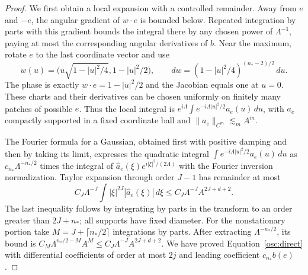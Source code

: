 \begin{proof}
We first obtain a local expansion with a controlled remainder.  Away
from $e$ and $-e$, the angular gradient of $w\cdot e$ is bounded below.
Repeated integration by parts with this gradient bounds the integral
there by any chosen power of $\Lambda^{-1}$, paying at most the
corresponding angular derivatives of $b$.  Near the maximum, rotate $e$
to the last coordinate vector and use
\[
 w(u)=\bigl(u\sqrt{1-|u|^2/4},1-|u|^2/2\bigr),\qquad
 dw=(1-|u|^2/4)^{(n_*-2)/2}\,du.
\]
The phase is exactly $w\cdot e=1-|u|^2/2$ and the Jacobian equals one at
$u=0$.  These charts and their
derivatives can be chosen uniformly on finitely many patches of possible
$e$.  Thus the local integral is
$e^{i\Lambda}\int e^{-i\Lambda|u|^2/2}a_e(u)\,du$, with $a_e$
compactly supported in a fixed coordinate ball and
$\|a_e\|_{C^m}\lesssim_m A^m$.

The Fourier formula for a Gaussian, obtained first with positive damping
and then by taking its limit, expresses the quadratic integral
$\int e^{-i\Lambda|u|^2/2}a_e(u)\,du$ as
$c_{n_*}\Lambda^{-n_*/2}$ times the integral of
$\widehat a_e(\xi)e^{i|\xi|^2/(2\Lambda)}$ with the Fourier inversion
normalization.  Taylor expansion through order $J-1$ has remainder at
most
\[
 C_J\Lambda^{-J}
       \int |\xi|^{2J}|\widehat a_e(\xi)|\,d\xi
 \le C_J\Lambda^{-J}A^{2J+d+2}.
\]
The last inequality follows by integrating by parts in the transform to
an order greater than $2J+n_*$; all supports have fixed diameter.
For the nonstationary portion take
$M=J+\lceil n_*/2\rceil$ integrations by parts.  After extracting
$\Lambda^{-n_*/2}$, its bound is
$C_M\Lambda^{n_*/2-M}A^M\le C_J\Lambda^{-J}A^{2J+d+2}$.
We have proved
Equation~\eqref{osc:direct} with differential coefficients of order at
most $2j$ and leading coefficient $c_{n_*}b(e)$.


\end{proof}

